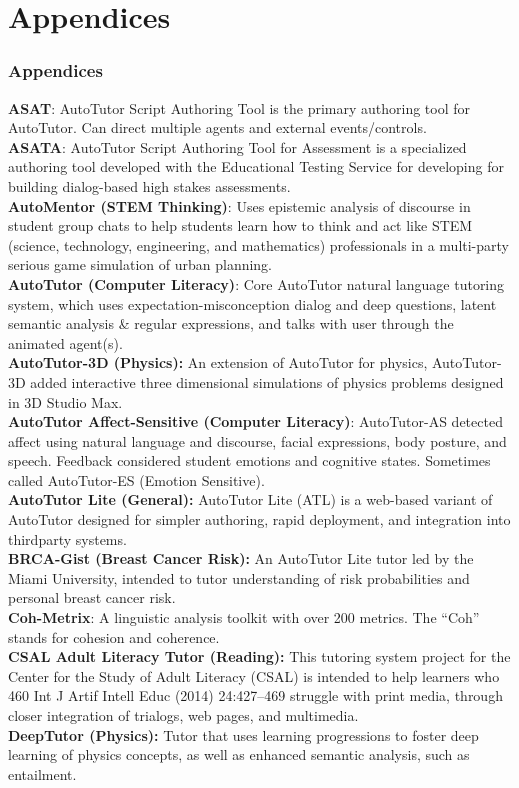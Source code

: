 \documentclass{beamer}
\begin{document}
\section{Appendices}
\begin{frame}

\frametitle{Appendices}
{\tiny \textbf{ASAT}: AutoTutor Script Authoring Tool is the primary authoring tool for AutoTutor.
Can direct multiple agents and external events/controls.\\
\textbf{ASATA}: AutoTutor Script Authoring Tool for Assessment is a specialized authoring
tool developed with the Educational Testing Service for developing for building dialog-based high stakes assessments.\\
\textbf{AutoMentor (STEM Thinking)}: Uses epistemic analysis of discourse in student group
chats to help students learn how to think and act like STEM (science, technology, engineering, and mathematics) professionals in a multi-party serious game
simulation of urban planning.\\
\textbf{AutoTutor (Computer Literacy)}: Core AutoTutor natural language tutoring system,
which uses expectation-misconception dialog and deep questions, latent
semantic analysis \& regular expressions, and talks with user through the
animated agent(s).\\
\textbf{AutoTutor-3D (Physics):} An extension of AutoTutor for physics, AutoTutor-3D
added interactive three dimensional simulations of physics problems designed
in 3D Studio Max.\\
\textbf{AutoTutor Affect-Sensitive (Computer Literacy)}: AutoTutor-AS detected affect
using natural language and discourse, facial expressions, body posture, and
speech. Feedback considered student emotions and cognitive states. Sometimes
called AutoTutor-ES (Emotion Sensitive).\\
\textbf{AutoTutor Lite (General):} AutoTutor Lite (ATL) is a web-based variant of AutoTutor
designed for simpler authoring, rapid deployment, and integration into thirdparty systems.\\
\textbf{BRCA-Gist (Breast Cancer Risk):} An AutoTutor Lite tutor led by the Miami University, intended to tutor understanding of risk probabilities and personal breast
cancer risk.\\
\textbf{Coh-Metrix}: A linguistic analysis toolkit with over 200 metrics. The “Coh” stands for
cohesion and coherence.\\
\textbf{CSAL Adult Literacy Tutor (Reading):} This tutoring system project for the Center
for the Study of Adult Literacy (CSAL) is intended to help learners who
460 Int J Artif Intell Educ (2014) 24:427–469
struggle with print media, through closer integration of trialogs, web pages, and
multimedia.\\
\textbf{DeepTutor (Physics):} Tutor that uses learning progressions to foster deep learning of physics concepts, as well as enhanced semantic analysis, such as entailment.\\
 }
\end{frame}
\end{document}
